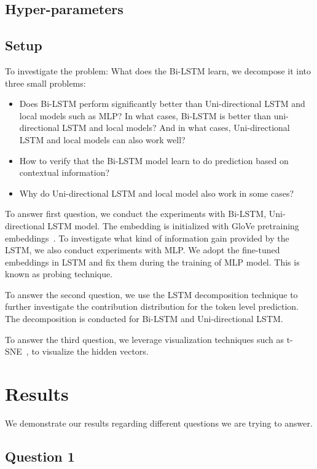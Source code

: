 \documentclass{article}
\begin{document}
\subsection{Hyper-parameters}


\subsection{Setup}

To investigate the problem: What does the Bi-LSTM learn, we decompose it into three small problems:

\begin{itemize}
	\item Does Bi-LSTM perform significantly better than Uni-directional LSTM and local models such as MLP? In what cases, Bi-LSTM is better than uni-directional LSTM and local models? And in what cases, Uni-directional LSTM and local models can also work well?
	\item How to verify that the Bi-LSTM model learn to do prediction based on contextual information?
	\item Why do Uni-directional LSTM and local model also work in some cases? 
\end{itemize}

To answer first question, we conduct the experiments with Bi-LSTM, Uni-directional LSTM model. The embedding is initialized with GloVe pretraining embeddings~\cite{pennington2014glove}. To investigate what kind of information gain provided by the LSTM, we also conduct experiments with MLP. We adopt the fine-tuned embeddings in LSTM and fix them during the training of MLP model. This is known as probing technique. 

To answer the second question, we use the LSTM decomposition technique to further investigate the contribution distribution for the token level prediction. The decomposition is conducted for Bi-LSTM and Uni-directional LSTM. 

To answer the third question, we leverage visualization techniques such as t-SNE~\cite{maaten2008visualizing}, to visualize the hidden vectors.

\section{Results}

We demonstrate our results regarding different questions we are trying to answer. 


\subsection{Question 1}
\end{document}
